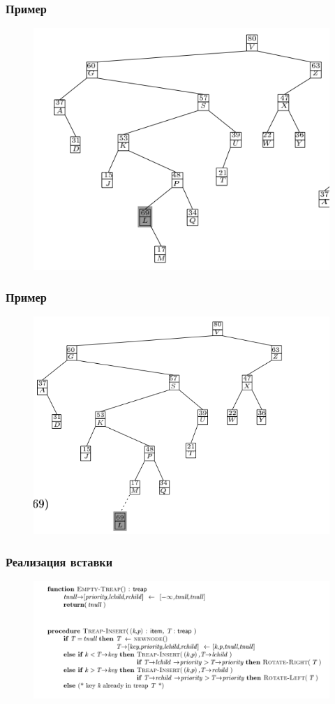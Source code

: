 \documentclass[hyperref={unicode=true}]{beamer}
\begin{document}
\frame
{
  \frametitle{Пример}
  \begin{figure}[h!]
  \centerline{\includegraphics[scale=0.5]{ins5.png}}
  \end{figure}
}

\frame
{
  \frametitle{Пример}
  \begin{figure}[h!]
  \centerline{\includegraphics[scale=0.5]{ins6.png}}
  \end{figure}
}

\frame
{
  \frametitle{Реализация вставки}
  \begin{figure}[h!]
  \centerline{\includegraphics[scale=0.37]{ins-algo.png}}
  \end{figure}
}
\end{document}
